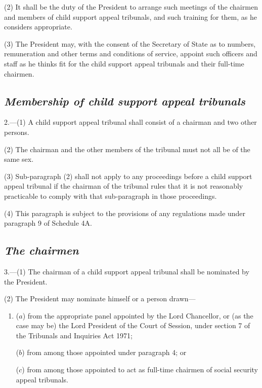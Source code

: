 \documentclass[12pt,a4paper]{article}
\begin{document}
(2) It shall be the duty of the President to arrange such meetings of the chairmen and members of child support appeal tribunals, and such training for them, as he considers appropriate.

(3) The President may, with the consent of the Secretary of State as to numbers, remuneration and other terms and conditions of service, appoint such officers and staff as he thinks fit for the child support appeal tribunals and their full-time chairmen.


\subsection*{\itshape Membership of child support appeal tribunals}

2.---(1) A child support appeal tribunal shall consist of a chairman and two other persons.

(2) The chairman and the other members of the tribunal must not all be of the same sex.

(3) Sub-paragraph (2)  shall not apply to any proceedings before a child support appeal tribunal if the chairman of the tribunal rules that it is not reasonably practicable to comply with that sub-paragraph in those proceedings.

(4) This paragraph is subject to the provisions of any regulations made under paragraph 9 of Schedule 4A.


\subsection*{\itshape The chairmen}

3.---(1) The chairman of a child support appeal tribunal shall be nominated by the President.

(2) The President may nominate himself or a person drawn—
\begin{enumerate}\item[]
($a$) from the appropriate panel appointed by the Lord Chancellor, or (as the case may be) the Lord President of the Court of Session, under section 7 of the Tribunals and Inquiries Act 1971;

($b$) from among those appointed under paragraph 4; or

($c$) from among those appointed 
to act as full-time chairmen of social security appeal tribunals.
\end{enumerate}
\end{document}
